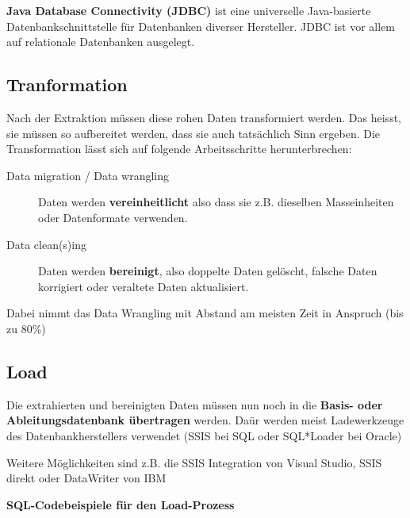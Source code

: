 \documentclass[a4paper, 11pt, nofootinbib]{article}
\begin{document}
\vspace{10px}

\noindent \textbf{Java Database Connectivity (JDBC)} ist eine universelle Java-basierte Datenbankschnittstelle für Datenbanken diverser Hersteller. JDBC ist vor allem auf relationale Datenbanken ausgelegt.


\subsection{Tranformation}

Nach der Extraktion müssen diese rohen Daten transformiert werden. Das heisst, sie müssen so aufbereitet werden, dass sie auch tatsächlich Sinn ergeben. Die Transformation lässt sich auf folgende Arbeitsschritte herunterbrechen:

\begin{description}
	\item[Data migration / Data wrangling] Daten werden \textbf{vereinheitlicht} also dass sie z.B. dieselben Masseinheiten oder Datenformate verwenden.
	\item[Data clean(s)ing] Daten werden \textbf{bereinigt}, also doppelte Daten gelöscht, falsche Daten korrigiert oder veraltete Daten aktualisiert.
\end{description}

\vspace{10px}

\noindent Dabei nimmt das Data Wrangling mit Abstand am meisten Zeit in Anspruch (bis zu 80\%)


\subsection{Load}

Die extrahierten und bereinigten Daten müssen nun noch in die \textbf{Basis- oder Ableitungsdatenbank übertragen} werden. Daür werden meist Ladewerkzeuge des Datenbankherstellers verwendet (SSIS bei SQL oder SQL*Loader bei Oracle)

\vspace{10px}

\noindent 
Weitere Möglichkeiten sind z.B. die SSIS Integration von Visual Studio, SSIS direkt oder DataWriter von IBM

\vspace{10px}

\textbf{SQL-Codebeispiele für den Load-Prozess}

\vspace{10px}
\end{document}
